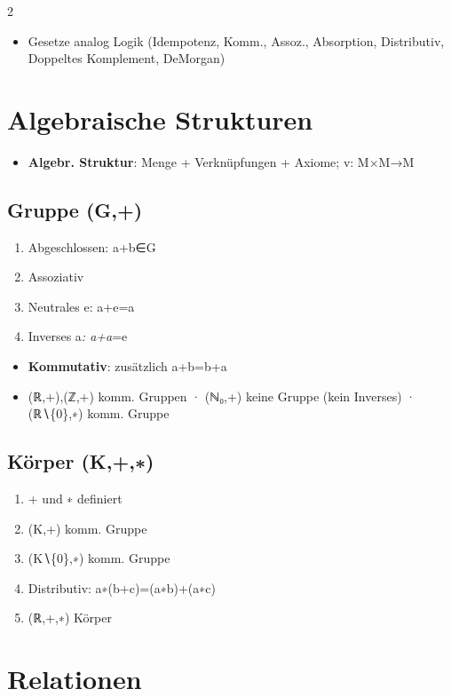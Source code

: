 \documentclass[10pt, a4paper]{article}
\begin{document}
\begin{multicols}{2}
\begin{itemize}
  \item Gesetze analog Logik (Idempotenz, Komm., Assoz., Absorption, Distributiv, Doppeltes Komplement, DeMorgan)
\end{itemize}


\section{Algebraische Strukturen}

\begin{itemize}
  \item \textbf{Algebr. Struktur}: Menge + Verknüpfungen + Axiome; v: M×M→M
\end{itemize}


\subsection{Gruppe (G,+)}
\begin{enumerate}
  \item Abgeschlossen: a+b∈G
  \item Assoziativ
  \item Neutrales e: a+e=a
  \item Inverses a\textit{: a+a}=e
\end{enumerate}

\begin{itemize}
  \item \textbf{Kommutativ}: zusätzlich a+b=b+a
  \item (ℝ,+),(ℤ,+) komm. Gruppen · (ℕ₀,+) keine Gruppe (kein Inverses) · (ℝ∖\{0\},∗) komm. Gruppe
\end{itemize}


\subsection{Körper (K,+,∗)}
\begin{enumerate}
  \item + und ∗ definiert
  \item (K,+) komm. Gruppe
  \item (K∖\{0\},∗) komm. Gruppe
  \item Distributiv: a∗(b+c)=(a∗b)+(a∗c)
  \item (ℝ,+,∗) Körper
\end{enumerate}


\section{Relationen}



\end{multicols}
\end{document}
